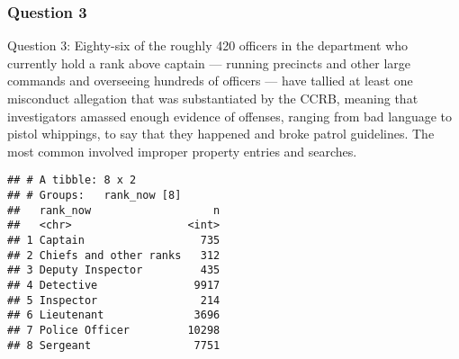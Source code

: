 \documentclass[
]{article}
\newenvironment{Shaded}{\begin{snugshade}}{\end{snugshade}}
\newcommand{\CommentTok}[1]{\textcolor[rgb]{0.56,0.35,0.01}{\textit{#1}}}
\newcommand{\KeywordTok}[1]{\textcolor[rgb]{0.13,0.29,0.53}{\textbf{#1}}}
\newcommand{\NormalTok}[1]{#1}
\newcommand{\OperatorTok}[1]{\textcolor[rgb]{0.81,0.36,0.00}{\textbf{#1}}}
\newcommand{\StringTok}[1]{\textcolor[rgb]{0.31,0.60,0.02}{#1}}
\begin{document}
\hypertarget{question-3}{%
\subsubsection{Question 3}\label{question-3}}

Question 3: Eighty-six of the roughly 420 officers in the department who
currently hold a rank above captain --- running precincts and other
large commands and overseeing hundreds of officers --- have tallied at
least one misconduct allegation that was substantiated by the CCRB,
meaning that investigators amassed enough evidence of offenses, ranging
from bad language to pistol whippings, to say that they happened and
broke patrol guidelines. The most common involved improper property
entries and searches.

\begin{Shaded}
\end{Shaded}

\begin{verbatim}
## # A tibble: 8 x 2
## # Groups:   rank_now [8]
##   rank_now                   n
##   <chr>                  <int>
## 1 Captain                  735
## 2 Chiefs and other ranks   312
## 3 Deputy Inspector         435
## 4 Detective               9917
## 5 Inspector                214
## 6 Lieutenant              3696
## 7 Police Officer         10298
## 8 Sergeant                7751
\end{verbatim}
\end{document}
